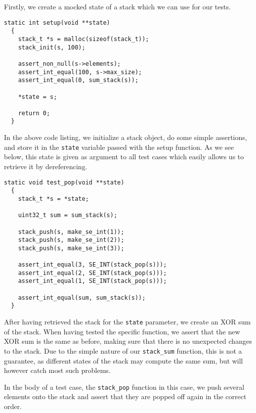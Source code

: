 Firstly, we create a mocked state of a stack which we can use for our tests.

\begin{minipage}{\linewidth}
\begin{lstlisting}[language={[ANSI]C},caption={Unit-test setup procedure}]
  static int setup(void **state)
  {
    stack_t *s = malloc(sizeof(stack_t));
    stack_init(s, 100);

    assert_non_null(s->elements);
    assert_int_equal(100, s->max_size);
    assert_int_equal(0, sum_stack(s));

    *state = s;

    return 0;
  }
\end{lstlisting}
\end{minipage}

In the above code listing, we initialize a stack object, do some simple
assertions, and store it in the {\tt state} variable passed with the setup
function. As we see below, this state is given as argument to all test cases
which easily allows us to retrieve it by dereferencing.

\begin{minipage}{\linewidth}
\begin{lstlisting}[language={[ANSI]C},caption={Unit-test of {\tt stack\_pop}}]
  static void test_pop(void **state)
  {
    stack_t *s = *state;

    uint32_t sum = sum_stack(s);

    stack_push(s, make_se_int(1));
    stack_push(s, make_se_int(2));
    stack_push(s, make_se_int(3));

    assert_int_equal(3, SE_INT(stack_pop(s)));
    assert_int_equal(2, SE_INT(stack_pop(s)));
    assert_int_equal(1, SE_INT(stack_pop(s)));

    assert_int_equal(sum, sum_stack(s));
  }
\end{lstlisting}
\end{minipage}

After having retrieved the stack for the {\tt state} parameter, we create an XOR
sum of the stack. When having tested the specific function, we assert that the
new XOR sum is the same as before, making sure that there is no unexpected
changes to the stack. Due to the simple nature of our {\tt stack\_sum} function,
this is not a guarantee, as different states of the stack may compute the same
sum, but will however catch most such problems.

In the body of a test case, the {\tt stack\_pop} function in this case, we push
several elements onto the stack and assert that they are popped off again in the
correct order.

